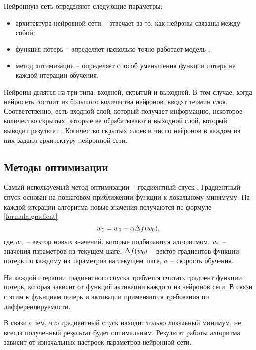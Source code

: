 Нейронную сеть определяют следующие параметры:
\begin{itemize}
	\item архитектура нейронной сети -- отвечает за то, как нейроны связаны между собой;
	\item функция потерь -- определяет насколько точно работает модель \cite{neuro_base};
	\item метод оптимизации -- определяет способ уменьшения функции потерь на каждой итерации обучения.
\end{itemize}

Нейроны делятся на три типа: входной, скрытый и выходной. В том случае, когда нейросеть состоит из большого количества нейронов, вводят термин слоя. Соответственно, есть входной слой, который получает информацию, некоторое количество скрытых, которые ее обрабатывают и выходной слой, который выводит результат \cite{neuro_architecture}. Количество скрытых слоев и число нейронов в каждом из них задают архитектуру нейронной сети.

\subsection{Методы оптимизации}
Самый используемый метод оптимизации -- градиентный спуск \cite{gradient}. Градиентный спуск основан на пошаговом приближении функции к локальному минимуму. На каждой итерации алгоритма новые значения получаются по формуле \ref{formula:gradient}
\begin{equation}\label{formula:gradient}
w_{\rm{1}} = w_{\rm{0}} - \alpha\Delta f(w_{\rm{0}}),
\end{equation}
где $w_{\rm{1}}$ -- вектор новых значений, которые подбираются алгоритмом, $w_{\rm{0}}$ -- значения параметров на текущем шаге, $\Delta f(w_{\rm{0}})$ -- вектор градиентов функции потерь по каждому из параметров на текущем шаге, $\alpha$ -- скорость обучения. 

На каждой итерации градиентного спуска требуется считать градиент функции потерь, которая зависит от функций активации каждого из нейронов сети. В связи с этим к фукнциям потерь и активации применяются требования по дифференцируемости.

В связи с тем, что градиентный спуск находит только локальный минимум, не всегда полученный результат будет оптимальным. Результат работы алгоритма зависит от изначальных настроек параметров нейронной сети.

